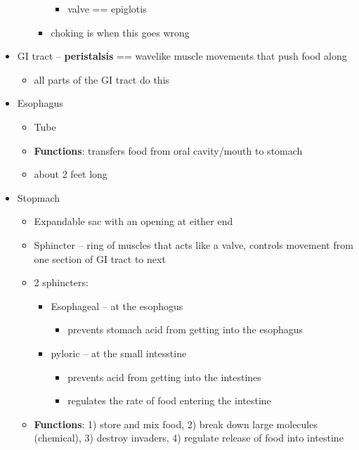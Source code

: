 \documentclass{article}
\theoremstyle{definition}
\begin{document}
\begin{itemize}
\begin{itemize}
\begin{itemize}
						\begin{itemize}
							\item valve == epiglotis
						\end{itemize}
					\item choking is when this goes wrong
				\end{itemize}
		\end{itemize}
	\item GI tract -- \textbf{peristalsis}  == wavelike muscle movements that push food along
		\begin{itemize}
			\item all parts of the GI tract do this
		\end{itemize}
	\item Esophagus
		\begin{itemize}
			\item Tube
			\item \textbf{Functions}: transfers food from oral cavity/mouth to stomach
			\item about 2 feet long
		\end{itemize}
	\item Stopmach
		\begin{itemize}
			\item Expandable sac with an opening at either end
			\item Sphincter -- ring of muscles that acts like a valve, controls movement from one section of GI tract to next
			\item 2 sphincters:
				\begin{itemize}
					\item Esophageal -- at the esophogus
						\begin{itemize}
							\item prevents stomach acid from getting into the esophagus
						\end{itemize}
					\item pyloric -- at the small intesstine
						\begin{itemize}
							\item prevents acid from getting into the intestines
							\item regulates the rate of food entering the intestine
						\end{itemize}
				\end{itemize}
			\item \textbf{Functions}: 1) store and mix food, 2) break down large molecules (chemical), 3) destroy invaders, 4) regulate release of food into intestine
				\begin{itemize}

\end{itemize}
\end{itemize}
\end{itemize}
\end{document}
